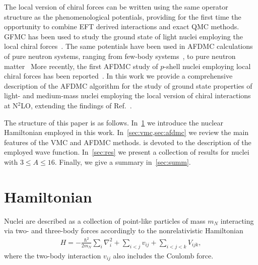 \documentclass[aps,prc,twocolumn,superscriptaddress,floatfix]{revtex4-1}
\begin{document}
The local version of chiral forces can be written using the same operator
structure as the phenomenological potentials, providing for the first time
the opportunity to combine EFT derived interactions and exact QMC methods.
GFMC has been used to study the ground state of light nuclei employing 
the local chiral forces~\cite{Gezerlis:2013,Gezerlis:2014,Tews:2016,Lynn:2016,Lynn:2017}.
The same potentials have been used in AFDMC calculations of pure neutron systems, 
ranging from few-body systems~\cite{Lynn:2014,Klos:2016,Zhao:2016,Gandolfi:2017}, to pure
neutron matter~\cite{Gezerlis:2013,Gezerlis:2014,Tews:2016}
More recently, the first AFDMC study of $p$-shell nuclei employing local
chiral forces has been reported~\cite{Lonardoni:2017afdmc}.
In this work we provide a comprehensive description of the AFDMC algorithm 
for the study of ground state properties of light- and medium-mass nuclei 
employing the local version of chiral interactions at N$^2$LO, extending
the findings of Ref.~\cite{Lonardoni:2017afdmc}.

The structure of this paper is as follows. 
In~\cref{sec:ham} we introduce the nuclear Hamiltonian employed in this work.
In~\cref{sec:vmc,sec:afdmc} we review the main features of the VMC and AFDMC methods.
 is devoted to the description of the employed wave function. 
In~\cref{sec:res} we present a collection of results for nuclei
with $3\le A\le 16$. 
Finally, we give a summary in~\cref{sec:summ}.


\section{Hamiltonian}
\label{sec:ham}
Nuclei are described as a collection of point-like particles of mass $m_N$ interacting 
via two- and three-body forces accordingly to the nonrelativistic Hamiltonian
\begin{align}
	H=-\frac{\hbar^2}{2m_N}\sum_i \nabla_i^2+\sum_{i<j}v_{ij}+\sum_{i<j<k}V_{ijk} ,
\end{align}
where the two-body interaction $v_{ij}$ also includes the Coulomb force.
\end{document}
